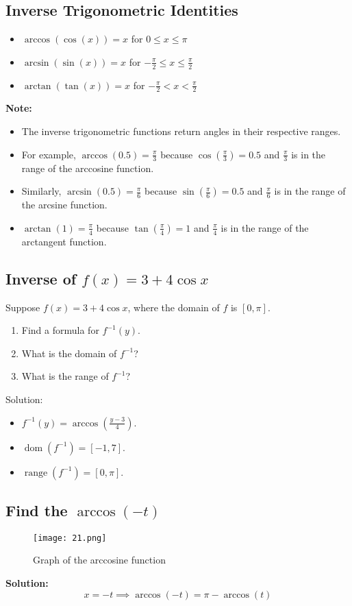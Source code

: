 \subsection{Inverse Trigonometric Identities}
\begin{itemize}
    \item $\arccos(\cos(x)) = x$ for $0 \leq x \leq \pi$
    \item $\arcsin(\sin(x)) = x$ for $-\frac{\pi}{2} \leq x \leq \frac{\pi}{2}$
    \item $\arctan(\tan(x)) = x$ for $-\frac{\pi}{2} < x < \frac{\pi}{2}$
\end{itemize}
\textbf{Note:}
\begin{itemize}
    \item The inverse trigonometric functions return angles in their respective ranges.
    \item For example, $\arccos(0.5) = \frac{\pi}{3}$ because $\cos(\frac{\pi}{3}) = 0.5$ and $\frac{\pi}{3}$ is in the range of the arccosine function.
    \item Similarly, $\arcsin(0.5) = \frac{\pi}{6}$ because $\sin(\frac{\pi}{6}) = 0.5$ and $\frac{\pi}{6}$ is in the range of the arcsine function.
    \item $\arctan(1) = \frac{\pi}{4}$ because $\tan(\frac{\pi}{4}) = 1$ and $\frac{\pi}{4}$ is in the range of the arctangent function.
\end{itemize}

\subsection{Inverse of $f(x)=3+4\cos x$}
Suppose $f(x)=3+4\cos x$, where the domain of $f$ is $[0,\pi]$.
\begin{enumerate}[]
  \item Find a formula for $f^{-1}(y)$.
  \item What is the domain of $f^{-1}$?
  \item What is the range of $f^{-1}$?
\end{enumerate}
Solution:
\begin{itemize}
  \item $f^{-1}(y)=\arccos\left(\frac{y-3}{4}\right)$.
  \item $\operatorname{dom}(f^{-1})=[-1,7]$.
  \item $\operatorname{range}(f^{-1})=[0,\pi]$.
\end{itemize}

\subsection{Find the $\arccos(-t)$}
\begin{figure}
    \centering
    \texttt{[image: 21.png]}
    \caption{Graph of the arccosine function}
\end{figure}
\textbf{Solution:}
\[ x = -t \implies \arccos(-t) = \pi - \arccos(t) \]

